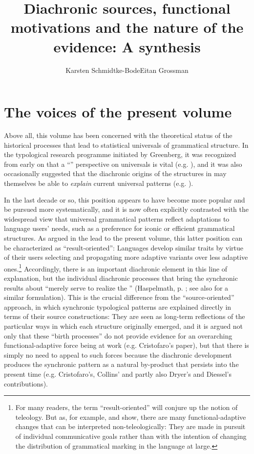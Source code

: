 \documentclass[output=paper]{langsci/langscibook}
\author{Karsten Schmidtke-Bode\affiliation{Leipzig University and Friedrich Schiller University Jena}\lastand Eitan Grossman\affiliation{Hebrew University of Jerusalem}}
\title{Diachronic sources, functional motivations and the nature of the evidence: A synthesis}
\begin{document}
\maketitle 
 
 

\section{The voices of the present volume}\label{sec:epilogue:1}

Above all, this volume has been concerned with the theoretical status of the historical processes that lead to statistical universals of grammatical structure. In the typological research programme initiated by Greenberg, it was recognized from early on that a “” perspective on universals is vital (e.g. \citealt{Greenberg1969}), and it was also occasionally suggested that the diachronic origins of the structures in  may themselves be able to \textit{explain} current universal patterns (e.g. \citealt{Givón1975,Greenberg1978_Diachr}). 

In the last decade or so, this position appears to have become more popular and be pursued more systematically, and it is now often explicitly contrasted with the widespread view that universal grammatical patterns reflect adaptations to language users’ needs, such as a preference for iconic or efficient grammatical structures. As argued in the lead  to the present volume, this latter position can be characterized as “result-oriented”: Languages develop similar traits by virtue of their users selecting and propagating more adaptive variants over less adaptive ones.\footnote{For many readers, the term “result-oriented” will conjure up the notion of teleology. But as, for example, \citet{Keller1994} and \citet[64--71]{Croft2000_Change} show, there are many functional-adaptive changes that can be interpreted non-teleologically: They are made in pursuit of individual communicative goals rather than with the intention of changing the distribution of grammatical marking in the language at large.} Accordingly, there is an important diachronic element in this line of explanation, but the individual diachronic processes that bring the synchronic results about “merely serve to realize the ” (Haspelmath, p. \pageref{p:haspelmath:merelyserve}; see also \citet[266]{Hawkins2004} for a similar formulation). This is the crucial difference from the “source-oriented” approach, in which synchronic typological patterns are explained directly in terms of their source constructions: They are seen as long-term reflections of the particular ways in which each structure originally emerged, and it is argued not only that these “birth processes” do not provide evidence for an overarching functional-adaptive force being at work (e.g. Cristofaro’s paper), but that there is simply no need to appeal to such forces because the diachronic development produces the synchronic pattern as a natural by-product that persists into the present time (e.g. Cristofaro’s, Collins’ and partly also Dryer’s and Diessel’s contributions). 
\end{document}
